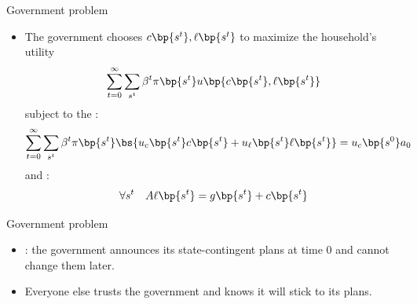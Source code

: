 \documentclass[11pt,xcolor={dvipsnames},hyperref={pdftex,pdfpagemode=UseNone,hidelinks,pdfdisplaydoctitle=true},usepdftitle=false]{beamer}
\begin{document}
    \begin{frame}{Government problem}
    \begin{itemize}
    \item The government chooses  $c\bp{s^t},\ell\bp{s^t}$ to maximize the household's utility 
    \begin{align*}
        \sum_{t=0}^\infty \sum_{s^t}  \beta^t \pi\bp{s^t} u\bp{c \bp{s^t},\ell\bp{s^t}}
    \end{align*}
    subject to the :
    \begin{align*}  
        \sum_{t=0}^\infty \sum_{s^t}  \beta^t \pi\bp{s^t} \bs{  u_c \bp{s^t} c\bp{s^t}  + u_{\ell} \bp{s^t} \ell\bp{s^t}}  = u_c \bp{s^0} a_0
    \end{align*}
    and : 
    \begin{align*}
    \forall s^t \quad   A \ell\bp{s^t} = g\bp{s^t} + c\bp{s^t}
    \end{align*}
    \end{itemize}
    \end{frame}
\begin{frame}{Government problem}
    \begin{itemize}
    \item {}: the government announces its state-contingent plans at time 0 and cannot change them later.
    \item Everyone else trusts the government and knows it will stick to its plans.
    \end{itemize}   
    \end{frame}
\end{document}

